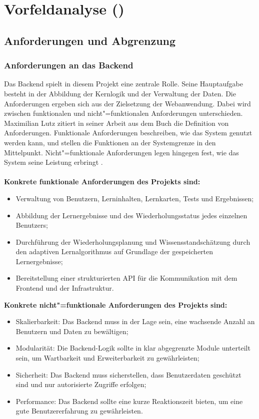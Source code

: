 \chapter{Vorfeldanalyse (\Luca)}
\label{chap:vorfeldanalyse}

\section{Anforderungen und Abgrenzung}


\subsection{Anforderungen an das Backend}
Das Backend spielt in diesem Projekt eine zentrale Rolle. Seine Hauptaufgabe besteht in der Abbildung der Kernlogik und der Verwaltung der Daten.
Die Anforderungen ergeben sich aus der Zielsetzung der Webanwendung.
Dabei wird zwischen funktionalen und nicht"=funktionalen Anforderungen unterschieden.
Maximilian Lutz zitiert in seiner Arbeit \cite{lutz2022} aus dem Buch \cite{broy2021} die Definition von Anforderungen.
Funktionale Anforderungen beschreiben, wie das System genutzt werden kann,
und stellen die Funktionen an der Systemgrenze in den Mittelpunkt.
Nicht"=funktionale Anforderungen legen hingegen fest, wie das System seine
Leistung erbringt \parencite[S.~16]{lutz2022}.\\
\\
\textbf{Konkrete funktionale Anforderungen des Projekts sind:}
\par
\begin{itemize}
    \item Verwaltung von Benutzern, Lerninhalten, Lernkarten, Tests und Ergebnissen;
    \item Abbildung der Lernergebnisse und des Wiederholungsstatus jedes einzelnen Benutzers;
    \item Durchführung der Wiederholungsplanung und Wissensstandschätzung durch den adaptiven Lernalgorithmus auf Grundlage der gespeicherten Lernergebnisse;
    \item Bereitstellung einer strukturierten API für die Kommunikation mit dem Frontend und der Infrastruktur.
\end{itemize}
\textbf{Konkrete nicht"=funktionale Anforderungen des Projekts sind:}
\par
\begin{itemize}
    \item Skalierbarkeit: Das Backend muss in der Lage sein, eine wachsende Anzahl an Benutzern und Daten zu bewältigen;
    \item Modularität: Die Backend-Logik sollte in klar abgegrenzte Module unterteilt sein, um Wartbarkeit und Erweiterbarkeit zu gewährleisten;
    \item Sicherheit: Das Backend muss sicherstellen, dass Benutzerdaten geschützt sind und nur autorisierte Zugriffe erfolgen;
    \item Performance: Das Backend sollte eine kurze Reaktionszeit bieten, um eine gute Benutzererfahrung zu gewährleisten.
\end{itemize}

